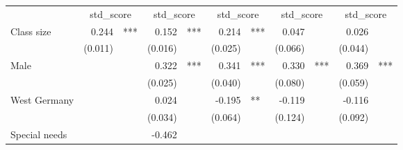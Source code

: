 \documentclass{article}
\begin{document}
\begin{table}[!h]
\centering
\begin{tabular}{lllllllllll}
\cline{1-11}
\multicolumn{1}{r}{} &
  \multicolumn{2}{c}{std\_score} &
  \multicolumn{2}{c}{std\_score} &
  \multicolumn{2}{c}{std\_score} &
  \multicolumn{2}{c}{std\_score} &
  \multicolumn{2}{c}{std\_score} \\
\cline{1-11}
\multicolumn{1}{l}{Class size} &
  \multicolumn{1}{r}{0.244} &
  \multicolumn{1}{l}{***} &
  \multicolumn{1}{r}{0.152} &
  \multicolumn{1}{l}{***} &
  \multicolumn{1}{r}{0.214} &
  \multicolumn{1}{l}{***} &
  \multicolumn{1}{r}{0.047} &
  \multicolumn{1}{l}{} &
  \multicolumn{1}{r}{0.026} &
  \multicolumn{1}{l}{} \\
\multicolumn{1}{l}{} &
  \multicolumn{1}{r}{(0.011)} &
  \multicolumn{1}{l}{} &
  \multicolumn{1}{r}{(0.016)} &
  \multicolumn{1}{l}{} &
  \multicolumn{1}{r}{(0.025)} &
  \multicolumn{1}{l}{} &
  \multicolumn{1}{r}{(0.066)} &
  \multicolumn{1}{l}{} &
  \multicolumn{1}{r}{(0.044)} &
  \multicolumn{1}{l}{} \\
\multicolumn{1}{l}{Male} &
  \multicolumn{1}{r}{} &
  \multicolumn{1}{l}{} &
  \multicolumn{1}{r}{0.322} &
  \multicolumn{1}{l}{***} &
  \multicolumn{1}{r}{0.341} &
  \multicolumn{1}{l}{***} &
  \multicolumn{1}{r}{0.330} &
  \multicolumn{1}{l}{***} &
  \multicolumn{1}{r}{0.369} &
  \multicolumn{1}{l}{***} \\
\multicolumn{1}{l}{} &
  \multicolumn{1}{r}{} &
  \multicolumn{1}{l}{} &
  \multicolumn{1}{r}{(0.025)} &
  \multicolumn{1}{l}{} &
  \multicolumn{1}{r}{(0.040)} &
  \multicolumn{1}{l}{} &
  \multicolumn{1}{r}{(0.080)} &
  \multicolumn{1}{l}{} &
  \multicolumn{1}{r}{(0.059)} &
  \multicolumn{1}{l}{} \\
\multicolumn{1}{l}{West Germany} &
  \multicolumn{1}{r}{} &
  \multicolumn{1}{l}{} &
  \multicolumn{1}{r}{0.024} &
  \multicolumn{1}{l}{} &
  \multicolumn{1}{r}{-0.195} &
  \multicolumn{1}{l}{**} &
  \multicolumn{1}{r}{-0.119} &
  \multicolumn{1}{l}{} &
  \multicolumn{1}{r}{-0.116} &
  \multicolumn{1}{l}{} \\
\multicolumn{1}{l}{} &
  \multicolumn{1}{r}{} &
  \multicolumn{1}{l}{} &
  \multicolumn{1}{r}{(0.034)} &
  \multicolumn{1}{l}{} &
  \multicolumn{1}{r}{(0.064)} &
  \multicolumn{1}{l}{} &
  \multicolumn{1}{r}{(0.124)} &
  \multicolumn{1}{l}{} &
  \multicolumn{1}{r}{(0.092)} &
  \multicolumn{1}{l}{} \\
\multicolumn{1}{l}{Special needs} &
  \multicolumn{1}{r}{} &
  \multicolumn{1}{l}{} &
  \multicolumn{1}{r}{-0.462} &

\end{tabular}
\end{table}
\end{document}
